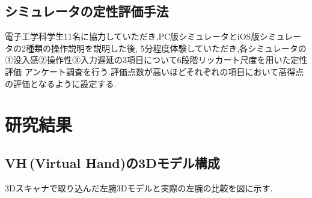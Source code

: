 \documentclass{ltjsreport}
\begin{document}
		
	\section{シミュレータの定性評価手法}
		電子工学科学生11名に協力していただき,PC版シミュレータとiOS版シミュレータの2種類の操作説明を説明した後,
		5分程度体験していただき,各シミュレータの①没入感②操作性③入力遅延の3項目について6段階リッカート尺度を用いた定性評価
		アンケート調査を行う.評価点数が高いほどそれぞれの項目において高得点の評価となるように設定する.

\chapter{研究結果}
	
	\section{VH\,(Virtual Hand)の3Dモデル構成}
		3Dスキャナで取り込んだ左腕3Dモデルと実際の左腕の比較を図に示す.
\end{document}
